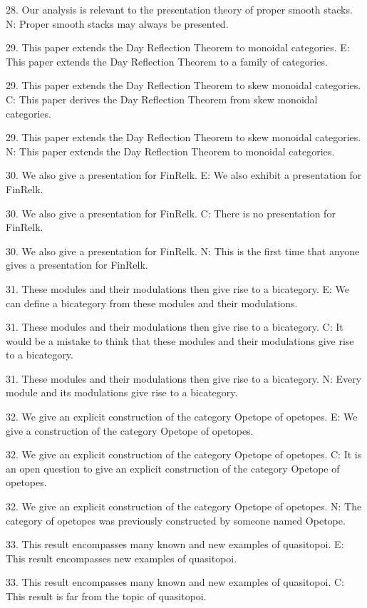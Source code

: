 28. Our analysis is relevant to the presentation theory of proper smooth stacks.
N: Proper smooth stacks may always be presented.

29. This paper extends the Day Reflection Theorem to  monoidal categories.
E:  This paper extends the Day Reflection Theorem to a family of categories.

29. This paper extends the Day Reflection Theorem to skew monoidal categories.
C: This paper derives the Day Reflection Theorem from skew monoidal categories.

29. This paper extends the Day Reflection Theorem to skew monoidal categories.
N: This paper extends the Day Reflection Theorem to monoidal categories.

30. We also give a presentation for FinRelk.
E: We also exhibit a presentation for FinRelk.

30. We also give a presentation for FinRelk.
C: There is no presentation for FinRelk.

30. We also give a presentation for FinRelk.
N: This is the first time that anyone gives a presentation for FinRelk.

31. These modules and their modulations then give rise to a bicategory.
E:  We can define a bicategory from these modules and their modulations.

31. These modules and their modulations then give rise to a bicategory.
C:  It would be a mistake to think that these modules and their modulations give rise to a bicategory.

31. These modules and their modulations then give rise to a bicategory.
N:  Every module and its modulations give rise to a bicategory.

32. We give an explicit construction of the category Opetope of opetopes.
E:  We give a construction of the category Opetope of opetopes.

32. We give an explicit construction of the category Opetope of opetopes.
C:  It is an open question to give an explicit construction of the category Opetope of opetopes.

32. We give an explicit construction of the category Opetope of opetopes.
N:  The category of opetopes was previously constructed by someone named Opetope.

33. This result encompasses many known and new examples of quasitopoi.
E:  This result encompasses new examples of quasitopoi.

33. This result encompasses many known and new examples of quasitopoi.
C:   This result is far from the topic of quasitopoi.

